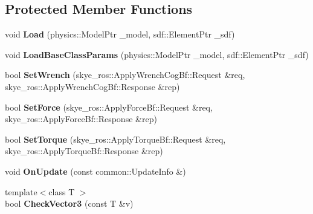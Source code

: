 \subsection*{Protected Member Functions}
\begin{DoxyCompactItemize}
\item 
\hypertarget{classgazebo_1_1_gazebo_blimp_wrench_plugin_a4636030577d7e57f36ac6e02b7bcad98}{void {\bfseries Load} (physics\-::\-Model\-Ptr \-\_\-model, sdf\-::\-Element\-Ptr \-\_\-sdf)}\label{classgazebo_1_1_gazebo_blimp_wrench_plugin_a4636030577d7e57f36ac6e02b7bcad98}

\item 
\hypertarget{classgazebo_1_1_gazebo_blimp_wrench_plugin_a6b157a3315f7d10e0f07894f05edce90}{void {\bfseries Load\-Base\-Class\-Params} (physics\-::\-Model\-Ptr \-\_\-model, sdf\-::\-Element\-Ptr \-\_\-sdf)}\label{classgazebo_1_1_gazebo_blimp_wrench_plugin_a6b157a3315f7d10e0f07894f05edce90}

\item 
\hypertarget{classgazebo_1_1_gazebo_blimp_wrench_plugin_a1d9a1b19accceeb7c6eb7256b4d9070f}{bool {\bfseries Set\-Wrench} (skye\-\_\-ros\-::\-Apply\-Wrench\-Cog\-Bf\-::\-Request \&req, skye\-\_\-ros\-::\-Apply\-Wrench\-Cog\-Bf\-::\-Response \&rep)}\label{classgazebo_1_1_gazebo_blimp_wrench_plugin_a1d9a1b19accceeb7c6eb7256b4d9070f}

\item 
\hypertarget{classgazebo_1_1_gazebo_blimp_wrench_plugin_a290e3c882facc530446084c3a810c6c2}{bool {\bfseries Set\-Force} (skye\-\_\-ros\-::\-Apply\-Force\-Bf\-::\-Request \&req, skye\-\_\-ros\-::\-Apply\-Force\-Bf\-::\-Response \&rep)}\label{classgazebo_1_1_gazebo_blimp_wrench_plugin_a290e3c882facc530446084c3a810c6c2}

\item 
\hypertarget{classgazebo_1_1_gazebo_blimp_wrench_plugin_af4e6c14a01e2c9365aa508d7823c67b5}{bool {\bfseries Set\-Torque} (skye\-\_\-ros\-::\-Apply\-Torque\-Bf\-::\-Request \&req, skye\-\_\-ros\-::\-Apply\-Torque\-Bf\-::\-Response \&rep)}\label{classgazebo_1_1_gazebo_blimp_wrench_plugin_af4e6c14a01e2c9365aa508d7823c67b5}

\item 
\hypertarget{classgazebo_1_1_gazebo_blimp_wrench_plugin_ab7679050ec2c1f4f7b75b3889cdec6c8}{void {\bfseries On\-Update} (const common\-::\-Update\-Info \&)}\label{classgazebo_1_1_gazebo_blimp_wrench_plugin_ab7679050ec2c1f4f7b75b3889cdec6c8}

\item 
\hypertarget{classgazebo_1_1_gazebo_blimp_wrench_plugin_aab9fb73bade52597f7070bb8faef7378}{{\footnotesize template$<$class T $>$ }\\bool {\bfseries Check\-Vector3} (const T \&v)}\label{classgazebo_1_1_gazebo_blimp_wrench_plugin_aab9fb73bade52597f7070bb8faef7378}


\end{DoxyCompactItemize}
